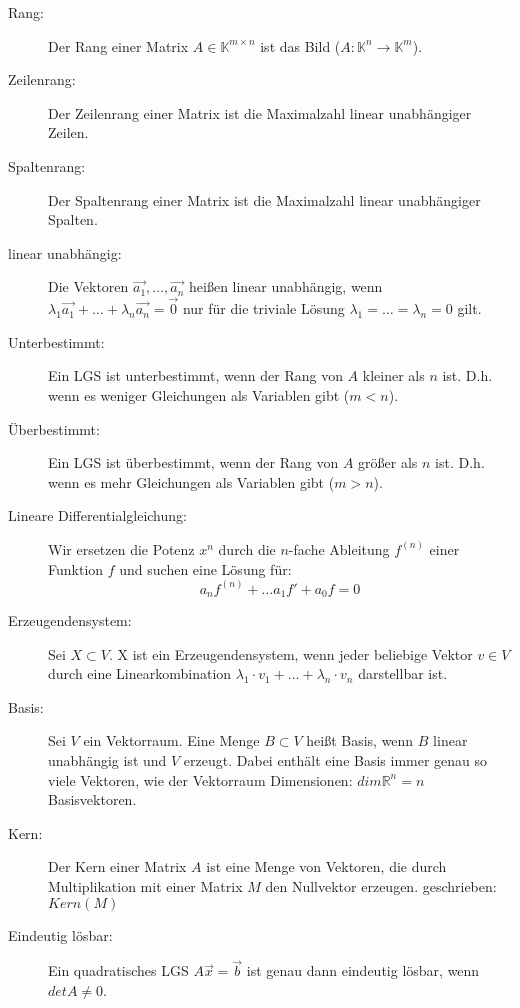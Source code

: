 \begin{description}
  \item [Rang:]
    Der Rang einer Matrix $A \in \mathbb{K}^{m \times n}$ ist das Bild
    ($A : \mathbb{K}^n \rightarrow \mathbb{K}^m$).

  \item [Zeilenrang:]
    Der Zeilenrang einer Matrix ist die Maximalzahl linear unabhängiger Zeilen.

  \item [Spaltenrang:]
    Der Spaltenrang einer Matrix ist die Maximalzahl linear unabhängiger Spalten.

  \item [linear unabhängig:]
    Die Vektoren $\vec{a_1},\dots,\vec{a_n}$ heißen linear unabhängig, wenn 
    $\lambda_1\vec{a_1} + \dots + \lambda_n\vec{a_n} = \vec{0}$ nur für die 
    triviale Lösung $\lambda_1 = \dots = \lambda_n = 0$ gilt.

  \item [Unterbestimmt:]
    Ein LGS ist unterbestimmt, wenn der Rang von $A$ kleiner als $n$ ist. D.h. 
    wenn es weniger Gleichungen als Variablen gibt ($m < n$).

  \item [Überbestimmt:]
    Ein LGS ist überbestimmt, wenn der Rang von $A$ größer als $n$ ist. D.h. 
    wenn es mehr Gleichungen als Variablen gibt ($m > n$).

  \item [Lineare Differentialgleichung:]
    Wir ersetzen die Potenz $x^n$ durch die $n$-fache Ableitung $f^{(n)}$ einer 
    Funktion $f$ und suchen eine Lösung für:
    \begin{equation*}
      a_nf^{(n)} + \dots a_1f' + a_0f = 0
    \end{equation*}

  \item [Erzeugendensystem:]
    Sei $X \subset V$. X ist ein Erzeugendensystem, wenn jeder beliebige Vektor 
    $v \in V$ durch eine Linearkombination
    $\lambda_1 \cdot v_1 + \dots + \lambda_n \cdot v_n$ darstellbar ist.

  \item [Basis:]
    Sei $V$ ein Vektorraum. Eine Menge $B \subset V$ heißt Basis, wenn $B$ 
    linear unabhängig ist und $V$ erzeugt. Dabei enthält eine Basis immer genau
    so viele Vektoren, wie der Vektorraum Dimensionen: $dim\mathbb{R}^n = n$
    Basisvektoren.

  \item [Kern:]
    Der Kern einer Matrix $A$ ist eine Menge von Vektoren, die durch
    Multiplikation mit einer Matrix $M$ den Nullvektor erzeugen. geschrieben:
    $Kern(M)$

  \item [Eindeutig lösbar:]
    Ein quadratisches LGS $A\vec{x} = \vec{b}$ ist genau dann eindeutig lösbar,
    wenn $detA \neq 0$.
\end{description}

